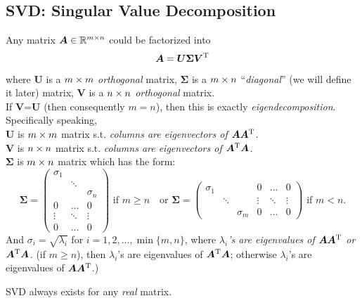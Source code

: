\subsection{SVD: Singular Value Decomposition}
Any matrix $\bm A\in\mathbb{R}^{m\times n}$ could be factorized into
\[
\bm A=\bm U\bm\Sigma\bm V^{\mathrm T}
\]
where $\bm U$ is a $m\times m$ \emph{orthogonal} matrix,
$\bm\Sigma$ is a $m\times n$ ``\textit{diagonal}'' (we will define it later) matrix,
$\bm V$ is a $n\times n$ \emph{orthogonal} matrix.\\
If $\bm V$=$\bm U$ (then consequently $m=n$), then this is exactly \textit{eigendecomposition}.\\
Specifically speaking,\\
$\bm U$ is $m\times m$ matrix s.t. \textit{columns are eigenvectors of $\bm A\bm A^{\mathrm T}$.}\\
$\bm V$ is $n\times n$ matrix s.t. \textit{columns are eigenvectors of $\bm A^{\mathrm T}\bm A$.}\\
$\bm\Sigma$ is $m\times n$ matrix which has the form:
\[
\bm\Sigma=\begin{pmatrix}
\sigma_1&&\\&\ddots&\\&&\sigma_n\\
0&\dots&0\\\vdots&\ddots&\vdots\\0&\dots&0
\end{pmatrix}\text{ if $m\ge n$}\quad\text{or }
\bm\Sigma=\begin{pmatrix}
\sigma_1&&&0&\dots&0\\&\ddots&&\vdots&\ddots&\vdots\\&&\sigma_m&0&\dots&0\end{pmatrix}\text{ if $m< n$}.
\]
And $\sigma_i=\sqrt{\lambda_i}$ for $i=1,2,\dots,\min\{m,n\}$, where \textit{$\lambda_i$'s are eigenvalues of $\bm A\bm A^{\mathrm T}$ or $\bm A^{\mathrm T}\bm A$.} (if $m\ge n$), then $\lambda_i$'s are eigenvalues of $\bm A^{\mathrm T}\bm A$; otherwise $\lambda_i$'s are eigenvalues of $\bm A\bm A^{\mathrm T}$.)
\begin{theorem}
SVD always exists for any \emph{real} matrix.
\end{theorem}
